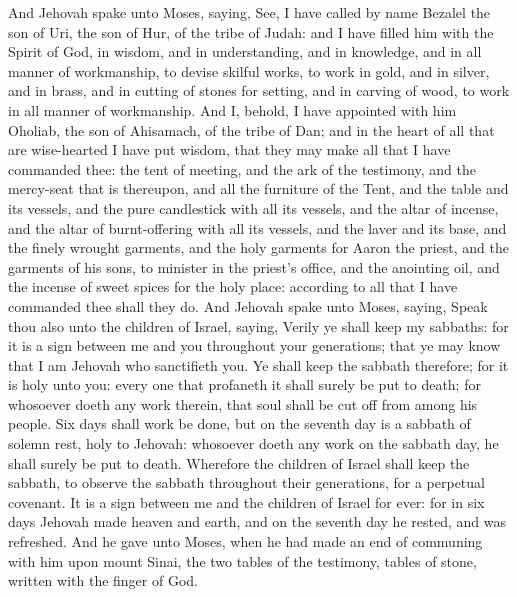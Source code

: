 And Jehovah spake unto Moses, saying, See, I have called by name Bezalel the son of Uri, the son of Hur, of the tribe of Judah: and I have filled him with the Spirit of God, in wisdom, and in understanding, and in knowledge, and in all manner of workmanship, to devise skilful works, to work in gold, and in silver, and in brass, and in cutting of stones for setting, and in carving of wood, to work in all manner of workmanship. And I, behold, I have appointed with him Oholiab, the son of Ahisamach, of the tribe of Dan; and in the heart of all that are wise-hearted I have put wisdom, that they may make all that I have commanded thee: the tent of meeting, and the ark of the testimony, and the mercy-seat that is thereupon, and all the furniture of the Tent, and the table and its vessels, and the pure candlestick with all its vessels, and the altar of incense, and the altar of burnt-offering with all its vessels, and the laver and its base, and the finely wrought garments, and the holy garments for Aaron the priest, and the garments of his sons, to minister in the priest’s office, and the anointing oil, and the incense of sweet spices for the holy place: according to all that I have commanded thee shall they do.  And Jehovah spake unto Moses, saying, Speak thou also unto the children of Israel, saying, Verily ye shall keep my sabbaths: for it is a sign between me and you throughout your generations; that ye may know that I am Jehovah who sanctifieth you. Ye shall keep the sabbath therefore; for it is holy unto you: every one that profaneth it shall surely be put to death; for whosoever doeth any work therein, that soul shall be cut off from among his people. Six days shall work be done, but on the seventh day is a sabbath of solemn rest, holy to Jehovah: whosoever doeth any work on the sabbath day, he shall surely be put to death. Wherefore the children of Israel shall keep the sabbath, to observe the sabbath throughout their generations, for a perpetual covenant. It is a sign between me and the children of Israel for ever: for in six days Jehovah made heaven and earth, and on the seventh day he rested, and was refreshed.  And he gave unto Moses, when he had made an end of communing with him upon mount Sinai, the two tables of the testimony, tables of stone, written with the finger of God. 

